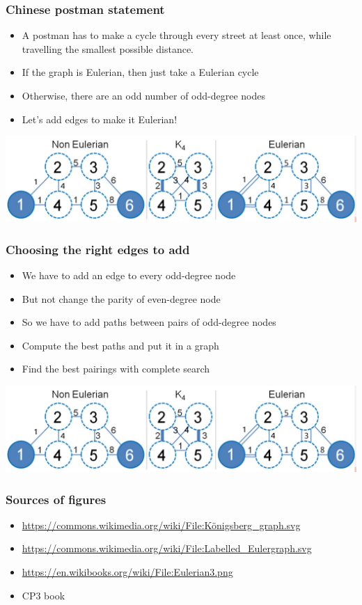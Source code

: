 \documentclass[12pt]{beamer}
\begin{document}
\begin{frame}
\frametitle{Chinese postman statement}
\begin{itemize}
\item A postman has to make a cycle through every street at least once, while travelling the smallest possible distance.
\item If the graph is Eulerian, then just take a Eulerian cycle
\item Otherwise, there are an odd number of odd-degree nodes
\item Let's add edges to make it Eulerian!
\end{itemize}
\begin{center}
\includegraphics[width=.9\linewidth]{img/cp3-complete}
\end{center}
\end{frame}

\begin{frame}
\frametitle{Choosing the right edges to add}
\begin{itemize}
\item We have to add an edge to every odd-degree node
\item But not change the parity of even-degree node
\item So we have to add paths between pairs of odd-degree nodes
\item Compute the best paths and put it in a graph
\item Find the best pairings with complete search
\end{itemize}
\begin{center}
\includegraphics[width=.9\linewidth]{img/cp3-complete}
\end{center}
\end{frame}

\begin{frame}
\frametitle{Sources of figures}
\begin{itemize}
\item \url{https://commons.wikimedia.org/wiki/File:Königsberg_graph.svg}
\item \url{https://commons.wikimedia.org/wiki/File:Labelled_Eulergraph.svg}
\item \url{https://en.wikibooks.org/wiki/File:Eulerian3.png}
\item CP3 book
\end{itemize}
\end{frame}
\end{document}
